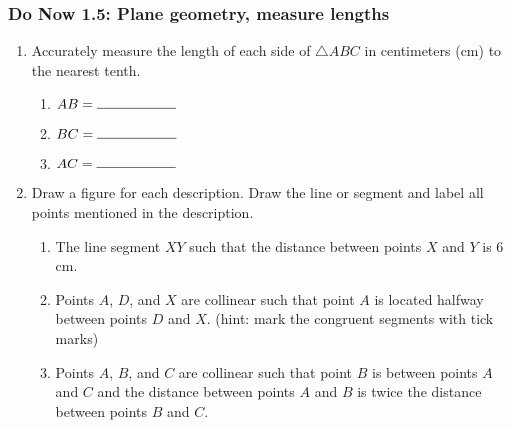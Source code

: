 \documentclass[12pt, oneside]{article}
\begin{document}
\newpage
\subsubsection*{Do Now 1.5: Plane geometry, measure lengths}
  \begin{enumerate}
    \item Accurately measure the length of each side of $\triangle ABC$ in centimeters (cm) to the nearest tenth.
      \bigskip
    \begin{enumerate}
      \item $AB=\rule{2cm}{0.15mm}$ \bigskip
      \item $BC=\rule{2cm}{0.15mm}$ \bigskip
      \item $AC=\rule{2cm}{0.15mm}$
    \end{enumerate}
    \begin{center}
    \end{center}

  \item Draw a figure for each description. Draw the line or segment and label all points mentioned in the description.
  \begin{enumerate}
    \item The line segment $XY$ such that the distance between points $X$ and $Y$ is 6 cm. \vspace{2cm}
    \item Points $A$, $D$, and $X$ are collinear such that point $A$ is located halfway between points $D$ and $X$. (hint: mark the congruent segments with tick marks) \vspace{2cm}
    \item Points $A$, $B$, and $C$ are collinear such that point $B$ is between points $A$ and $C$ and the distance between points $A$ and $B$ is twice the distance between points $B$ and $C$. \vspace{2cm}
  \end{enumerate}



  \end{enumerate}

\newpage
\end{document}
